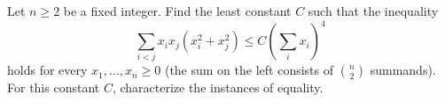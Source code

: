 Let $n \geq 2$ be a fixed integer. Find the least constant $C$ such that the inequality
\[ \sum_{i<j} x_i x_j (x_i^2 + x_j^2) \leq C \left( \sum_i x_i \right)^4 \]
holds for every $x_1, \ldots, x_n \geq 0$ (the sum on the left consists of $\binom{n}{2}$ summands). For this constant $C$, characterize the instances of equality.
